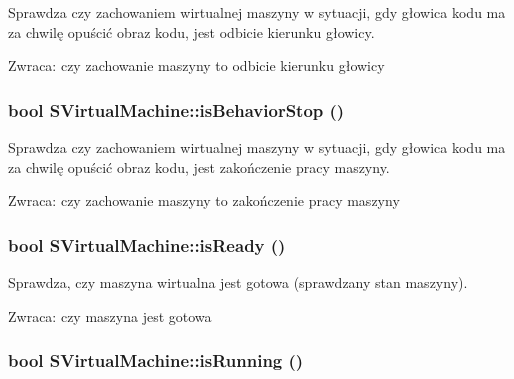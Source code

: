 Sprawdza czy zachowaniem wirtualnej maszyny w sytuacji, gdy głowica kodu ma za chwilę opuścić obraz kodu, jest odbicie kierunku głowicy. \begin{Desc}
\item[Zwraca:]czy zachowanie maszyny to odbicie kierunku głowicy \end{Desc}
\hypertarget{classSVirtualMachine_9e4042e279737a419aa9200f8fe9f961}{
\subsubsection[{isBehaviorStop}]{\setlength{\rightskip}{0pt plus 5cm}bool SVirtualMachine::isBehaviorStop ()}}
\label{classSVirtualMachine_9e4042e279737a419aa9200f8fe9f961}


Sprawdza czy zachowaniem wirtualnej maszyny w sytuacji, gdy głowica kodu ma za chwilę opuścić obraz kodu, jest zakończenie pracy maszyny. \begin{Desc}
\item[Zwraca:]czy zachowanie maszyny to zakończenie pracy maszyny \end{Desc}
\hypertarget{classSVirtualMachine_86dfbb99cbccd36729253cf34835c805}{
\subsubsection[{isReady}]{\setlength{\rightskip}{0pt plus 5cm}bool SVirtualMachine::isReady ()}}
\label{classSVirtualMachine_86dfbb99cbccd36729253cf34835c805}


Sprawdza, czy maszyna wirtualna jest gotowa (sprawdzany stan maszyny). \begin{Desc}
\item[Zwraca:]czy maszyna jest gotowa \end{Desc}
\hypertarget{classSVirtualMachine_09f1f983396791f84947f80097351862}{
\subsubsection[{isRunning}]{\setlength{\rightskip}{0pt plus 5cm}bool SVirtualMachine::isRunning ()}}
\label{classSVirtualMachine_09f1f983396791f84947f80097351862}



